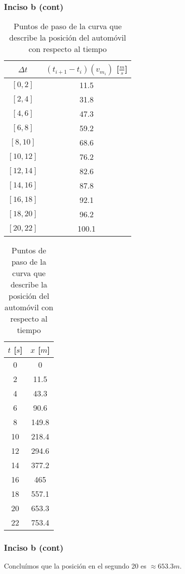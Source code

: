 \documentclass[11pt]{beamer}
\begin{document}
	\begin{frame}
		\frametitle{Inciso b (cont)}
		
		\begin{table}[H]
			\centering
			\begin{tabular}{|c|c|}
				\hline
				$\Delta t$ & $(t_{i+1} - t_{i})(v_{m_{i}})$ [$\frac{m}{s}$]\\
				\hline
				$[0,2]$&11.5\\
				\hline
				$[2,4]$&31.8\\
				\hline
				$[4,6]$&47.3\\
				\hline
				$[6,8]$&59.2\\
				\hline
				$[8,10]$&68.6\\
				\hline
				$[10,12]$&76.2\\
				\hline
				$[12,14]$&82.6\\
				\hline
				$[14,16]$&87.8\\
				\hline
				$[16,18]$&92.1\\
				\hline
				$[18,20]$&96.2\\
				\hline
				$[20,22]$&100.1\\
				\hline
			\end{tabular}
			\qquad
			\begin{tabular}{|c|c|}
				\hline
				$t$ [$s$] & $x$ [$m$]\\
				\hline
				0&0\\
				\hline
				2&11.5\\
				\hline
				4&43.3\\
				\hline
				6&90.6\\
				\hline
				8&149.8\\
				\hline
				10&218.4\\
				\hline
				12&294.6\\
				\hline
				14&377.2\\
				\hline
				16&465\\
				\hline
				18&557.1\\
				\hline
				\alert{20}&\alert{653.3}\\
				\hline
				22&753.4\\
				\hline
			\end{tabular}
			\caption{Puntos de paso de la curva que describe la posición del automóvil con respecto al tiempo}
			\label{tab:Posiciones2}
		\end{table}
	\end{frame}

	\begin{frame}
		\frametitle{Inciso b (cont)}
		Concluímos que la posición en el segundo 20 es $\approx 653.3m$.
	\end{frame}
\end{document}
